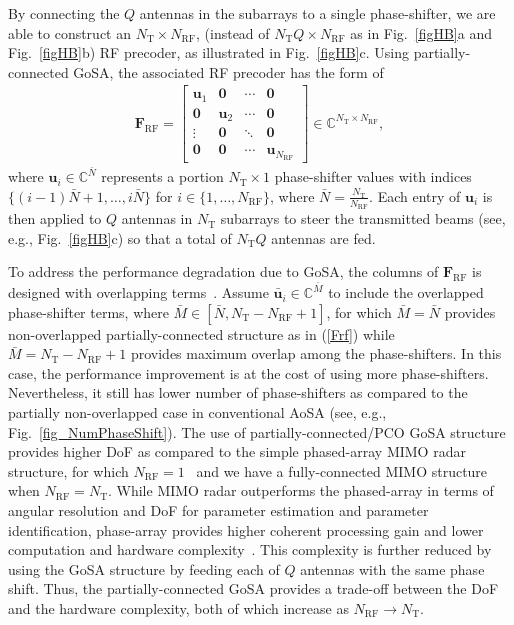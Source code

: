 \documentclass[journal,10pt]{IEEEtran}
\begin{document}
	By connecting the $Q$ antennas in the subarrays to a single phase-shifter, we are able to construct an $N_\mathrm{T}\times N_\mathrm{RF}$, (instead of $N_\mathrm{T}Q\times N_\mathrm{RF}$ as in Fig.~\ref{figHB}a and Fig.~\ref{figHB}b) RF precoder, as illustrated in Fig.~\ref{figHB}c. Using partially-connected GoSA, the associated RF precoder has the form of
	\begin{align}
	\label{Frf}
	\mathbf{F}_\mathrm{RF} = \left[\begin{array}{cccc}
	{\mathbf{u}}_1 & \mathbf{0} & \cdots & \mathbf{0} \\
	\mathbf{0} & {\mathbf{u}}_2 & \cdots & \mathbf{0} \\
	\vdots & \mathbf{0} & \ddots & \mathbf{0} \\
	\mathbf{0} & \mathbf{0} & \cdots & {\mathbf{u}}_{N_\mathrm{RF}}
	\end{array} \right]\in \mathbb{C}^{N_\mathrm{T}\times N_\mathrm{RF}},
	\end{align}
	where ${\mathbf{u}}_i\in \mathbb{C}^{\bar{N}}$ represents a portion $N_\mathrm{T}\times 1$ phase-shifter values with indices $\{(i-1)\bar{N}+1,\dots, i\bar{N}\}$ for $i \in \{ 1,\dots, N_\mathrm{RF}\}$, where $\bar{N} = \frac{N_\mathrm{T}}{N_\mathrm{RF}}$. Each entry of $\mathbf{u}_i$ is then applied to $Q$ antennas in $N_\mathrm{T}$ subarrays to steer the transmitted beams (see, e.g., Fig.~\ref{figHB}c) so that a total of $N_\mathrm{T}Q$ antennas are fed.
	
	
	
	
	To address the performance degradation due to GoSA, the columns of $\mathbf{F}_\mathrm{RF}$ is designed with overlapping terms~\cite{phasedArrayMIMOradar,overlappedSubarrayMassiveMIMO}. Assume $\bar{\mathbf{u}}_i \in \mathbb{C}^{\bar{M}}$ to include the overlapped phase-shifter terms, where $\bar{M} \in [\bar{N}, N_\mathrm{T} - N_\mathrm{RF}+1]$, for which $\bar{M}= \bar{N}$ provides non-overlapped partially-connected structure as in (\ref{Frf}) while $\bar{M} = N_\mathrm{T} - N_\mathrm{RF}+1$ provides maximum overlap among the phase-shifters. In this case, the performance improvement is at the cost of using more phase-shifters. Nevertheless, it still has lower number of phase-shifters as compared to the partially non-overlapped case in conventional AoSA (see, e.g., Fig.~\ref{fig_NumPhaseShift}). The use of partially-connected/PCO GoSA structure provides higher DoF as compared to the simple phased-array MIMO radar structure, for which $N_\mathrm{RF} = 1$~\cite{phasedArrayMIMOradar} and we have a fully-connected MIMO structure when $N_\mathrm{RF} = N_\mathrm{T}$.  While MIMO radar outperforms the phased-array in terms of angular resolution and DoF for parameter estimation and parameter identification, phase-array provides higher coherent processing gain and lower computation and hardware complexity~\cite{radarCommSurvey}. This complexity is further reduced by using the GoSA structure by feeding each of $Q$ antennas with the same phase shift.	Thus, the partially-connected GoSA provides a trade-off between the DoF and the hardware complexity, both of which increase as $N_\mathrm{RF} \rightarrow N_\mathrm{T}$.
	
\end{document}
